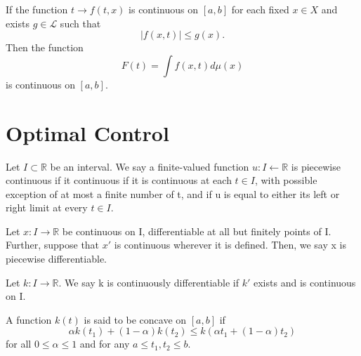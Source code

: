 \begin{corollary}
    If the function $t \to f(t,x)$ is continuous on $[a,b]$ for each fixed 
    $x \in X$ and exists $g \in \mathscr{L}$ such that 
    $$
        |f(x,t)| \leq g(x).
    $$
    Then the function
    $$
        F(t) = \displaystyle \int f(x,t)d\mu(x)
    $$
    is continuous on $[a,b]$.
\end{corollary}





\section{Optimal Control} 
	
\begin{definition}
	Let $I \subset \mathbb{R}$ be an interval. We say a finite-valued function
    $u : I \leftarrow \mathbb{R}$ is piecewise continuous if it continuous if it
    is continuous at each $t \in I$, with possible exception of at most a finite 
    number of t, and if u is equal to either its left or right limit at every
    $t \in I$.
\end{definition}
\begin{definition}
	Let $x : I \rightarrow \mathbb{R}$ be continuous on I, differentiable at all
    but finitely points of I. Further, suppose that $x'$ is continuous
    wherever it is defined. Then, we say x is piecewise differentiable.
\end{definition}
\begin{definition}
	Let $k : I \rightarrow \mathbb{R}$. We say k is continuously differentiable
    if $k' $ exists and is continuous on I.
\end{definition}
\begin{definition}
	A function $k(t)$ is said to be concave on $[a,b]$ if 
    $$
    	\alpha k(t_1) + (1-\alpha)k(t_2) \leq k(\alpha t_1 + (1-\alpha)t_2)
    $$
    for all $0 \leq \alpha \leq 1$ and for any $a \leq t_1,t_2 \leq b$.
\end{definition}

